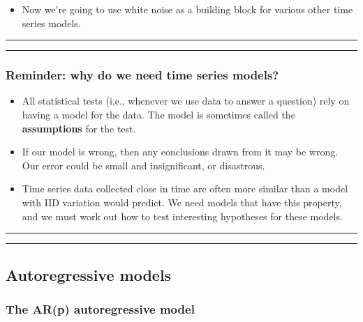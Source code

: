 \documentclass[]{article}
\providecommand{\tightlist}{%
  \setlength{\itemsep}{0pt}\setlength{\parskip}{0pt}}
\begin{document}
\begin{itemize}
\tightlist
\item
  Now we're going to use white noise as a building block for various
  other time series models.
\end{itemize}

\begin{center}\rule{0.5\linewidth}{\linethickness}\end{center}

\begin{center}\rule{0.5\linewidth}{\linethickness}\end{center}

\subsubsection{Reminder: why do we need time series
models?}\label{reminder-why-do-we-need-time-series-models}

\begin{itemize}
\item
  All statistical tests (i.e., whenever we use data to answer a
  question) rely on having a model for the data. The model is sometimes
  called the \textbf{assumptions} for the test.
\item
  If our model is wrong, then any conclusions drawn from it may be
  wrong. Our error could be small and insignificant, or disastrous.
\item
  Time series data collected close in time are often more similar than a
  model with IID variation would predict. We need models that have this
  property, and we must work out how to test interesting hypotheses for
  these models.
\end{itemize}

\begin{center}\rule{0.5\linewidth}{\linethickness}\end{center}

\begin{center}\rule{0.5\linewidth}{\linethickness}\end{center}

\subsection{Autoregressive models}\label{autoregressive-models}

\subsubsection{The AR(p) autoregressive
model}\label{the-arp-autoregressive-model}
\end{document}
